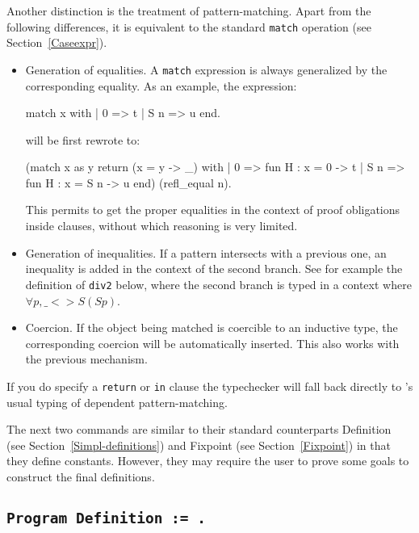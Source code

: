 Another distinction is the treatment of pattern-matching. Apart from the
following differences, it is equivalent to the standard {\tt match}
operation (see Section~\ref{Caseexpr}).
\begin{itemize}
\item Generation of equalities. A {\tt match} expression is always
  generalized by the corresponding equality. As an example,
  the expression: 

\begin{coq_example*}
  match x with
  | 0 => t
  | S n => u
  end.
\end{coq_example*}
will be first rewrote to:
\begin{coq_example*}
  (match x as y return (x = y -> _) with
  | 0 => fun H : x = 0 -> t
  | S n => fun H : x = S n -> u
  end) (refl_equal n).
\end{coq_example*}
  
  This permits to get the proper equalities in the context of proof
  obligations inside clauses, without which reasoning is very limited.

\item Generation of inequalities. If a pattern intersects with a
  previous one, an inequality is added in the context of the second
  branch. See for example the definition of {\tt div2} below, where the second
  branch is typed in a context where $\forall p, \_ <> S (S p)$.
  
\item Coercion. If the object being matched is coercible to an inductive
  type, the corresponding coercion will be automatically inserted. This also
  works with the previous mechanism.
\end{itemize}

If you do specify a {\tt return} or {\tt in} clause the typechecker will
fall back directly to \Coq's usual typing of dependent pattern-matching.

The next two commands are similar to their standard counterparts
Definition (see Section~\ref{Simpl-definitions}) and Fixpoint (see Section~\ref{Fixpoint}) in that
they define constants. However, they may require the user to prove some
goals to construct the final definitions.

\subsection{\tt Program Definition {\ident} := {\term}.
  \label{ProgramDefinition}}

